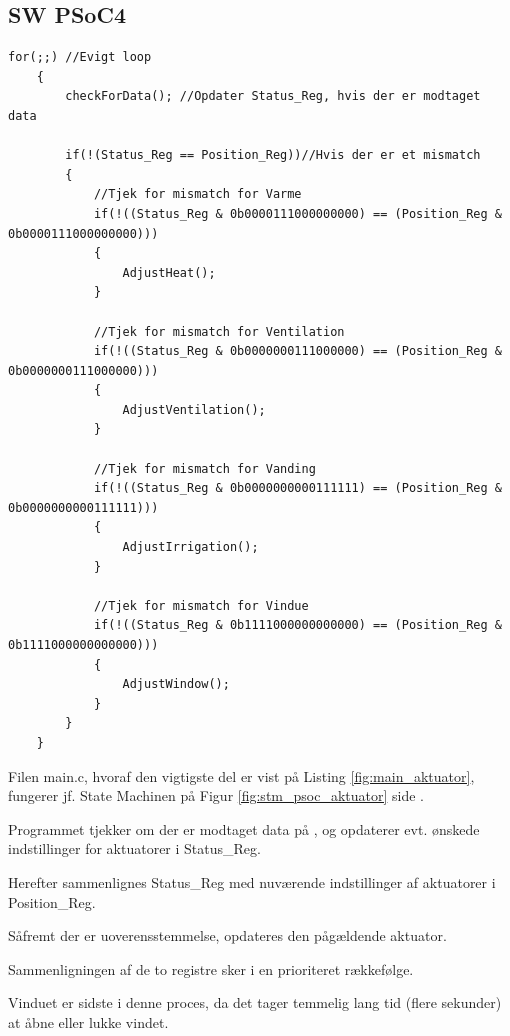 \clearpage

\subsection{SW PSoC4}

\begin{lstlisting}[caption=Udsnit af main.c for PSoC4 i Aktuator, label=fig:main_aktuator]
    for(;;) //Evigt loop
    {
        checkForData(); //Opdater Status_Reg, hvis der er modtaget data
        
        if(!(Status_Reg == Position_Reg))//Hvis der er et mismatch
        {
            //Tjek for mismatch for Varme
            if(!((Status_Reg & 0b0000111000000000) == (Position_Reg & 0b0000111000000000)))
            {
                AdjustHeat();
            }
            
            //Tjek for mismatch for Ventilation
            if(!((Status_Reg & 0b0000000111000000) == (Position_Reg & 0b0000000111000000)))
            {
                AdjustVentilation();
            }
            
            //Tjek for mismatch for Vanding
            if(!((Status_Reg & 0b0000000000111111) == (Position_Reg & 0b0000000000111111)))
            {
                AdjustIrrigation();
            }
            
            //Tjek for mismatch for Vindue
            if(!((Status_Reg & 0b1111000000000000) == (Position_Reg & 0b1111000000000000)))
            {
                AdjustWindow();
            }
        }
    }
\end{lstlisting}

Filen main.c, hvoraf den vigtigste del er vist på Listing \ref{fig:main_aktuator}, fungerer jf. State Machinen på Figur \ref{fig:stm_psoc_aktuator} side \pageref{fig:stm_psoc_aktuator}.

Programmet tjekker om der er modtaget data på \IIC, og opdaterer evt. ønskede indstillinger for aktuatorer i Status\_Reg. 

Herefter sammenlignes Status\_Reg med nuværende indstillinger af aktuatorer i Position\_Reg.

Såfremt der er uoverensstemmelse, opdateres den pågældende aktuator. 

Sammenligningen af de to registre sker i en prioriteret rækkefølge. 

Vinduet er sidste i denne proces, da det tager temmelig lang tid (flere sekunder) at åbne eller lukke vindet. 

\clearpage

